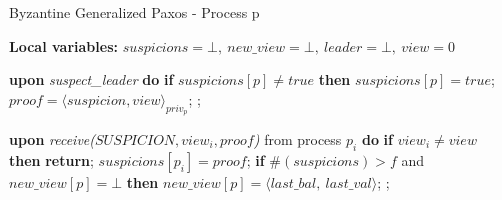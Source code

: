 \begin{algorithm} 
	\caption{Byzantine Generalized Paxos - Process p}
	\label{BFT-Proc}
	\textbf{Local variables:} $suspicions = \bot,\ new\_view = \bot,\ leader = \bot,\ view = 0$
	\begin{algorithmic}[1]
		
		\State \textbf{upon} \textit{suspect\_leader} \textbf{do} 
		\State \hspace{\algorithmicindent} \textbf{if} $suspicions[p] \neq true$ \textbf{then}
		\State\hspace{\algorithmicindent}\hspace{\algorithmicindent} $suspicions[p] = true$;
		\State\hspace{\algorithmicindent}\hspace{\algorithmicindent} $proof = \langle suspicion, view \rangle_{priv_p}$;
		\State\hspace{\algorithmicindent}\hspace{\algorithmicindent} ;	
		\State
		
		\State \textbf{upon} \textit{receive($SUSPICION, view_i, proof$)} from process $p_i$ \textbf{do} 
		\State \hspace{\algorithmicindent} \textbf{if} $view_i \neq view$ \textbf{then}
		\State \hspace{\algorithmicindent}\hspace{\algorithmicindent} \textbf{return};
		\State
		\State \hspace{\algorithmicindent} $suspicions[p_i] = proof$;
		\State \hspace{\algorithmicindent} \textbf{if} $\#(suspicions) > f$ and $new\_view[p] = \bot$ \textbf{then}
		\State\hspace{\algorithmicindent}\hspace{\algorithmicindent} $new\_view[p] = \langle last\_bal,\ last\_val \rangle$;
		\State\hspace{\algorithmicindent}\hspace{\algorithmicindent} ;
		\State
		

\end{algorithmic}
\end{algorithm}
